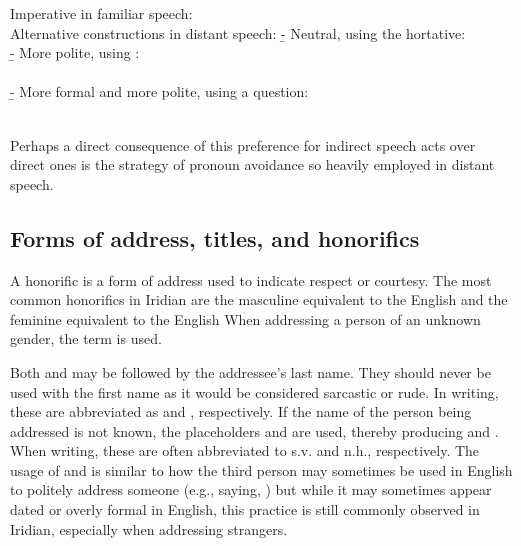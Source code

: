 \pex
\a Imperative in familiar speech:\\
 
\a Alternative constructions in distant speech:
\beginsubsub
  \b{-} {Neutral, using the hortative:\\
  	 }
  \b{-} {More polite, using :\\
  	\\}
  \b{-} {More formal and more polite, using a question:\\
  	\\
  	}
\endsubsub
\xe

Perhaps a direct consequence of this preference for indirect speech acts over direct ones is the strategy of {\sc pronoun avoidance} so heavily employed in distant speech.


\subsection{Forms of address, titles, and honorifics}

A {\sc honorific} is a form of address used to indicate respect or courtesy. The most common honorifics in
Iridian are the masculine  equivalent to the English  and the feminine
 equivalent to the English  When addressing a person of an unknown
gender, the term  is used.

Both  and  may be followed by the addressee's last name. They should never be used with
the first name as it would be considered sarcastic or rude. In writing, these are abbreviated as 
and , respectively. If the name of the person being addressed is not
known, the placeholders  and  are used, thereby producing 
and . When writing, these are often abbreviated to {\sc s.v.} and {\sc n.h.}, respectively.
The usage of  and  is similar to how the third person may sometimes be used
in English to politely address someone (e.g., saying, ) but while
it may sometimes appear dated or overly formal in English, this practice is still commonly observed
in Iridian, especially when addressing strangers.

